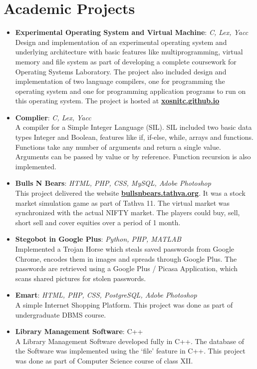 \documentclass[letterpaper,11pt]{article}
\newcommand{\resumeItem}[2]{
  \item\small{
    \textbf{#1}{: #2 \vspace{-2pt}}
  }
}
\newcommand{\resumeItemListStart}{\begin{itemize}}
\newcommand{\resumeItemListEnd}{\end{itemize}\vspace{-5pt}}
\begin{document}
\section{Academic Projects}
    \resumeItemListStart
        \resumeItem{Experimental Operating System and Virtual Machine} {\textit{C, Lex, Yacc}}\\
        Design and implementation of an experimental operating system and underlying architecture with basic features like multiprogramming, virtual memory and file system as part of developing a complete coursework for Operating Systems Laboratory. The project also included design and implementation of two language compilers, one for programming the operating system and one for programming application programs to run on this operating system. The project is hosted at \textbf{\href{http://xosnitc.github.io/}{xosnitc.github.io}}
        \resumeItem{Complier} {\textit{C, Lex, Yacc}}\\
        A compiler for a Simple Integer Language (SIL). SIL included two basic data types Integer and Boolean, features like if, if-else, while, arrays and functions. Functions take any number of arguments and return a single value. Arguments can be passed by value or by reference. Function recursion is also implemented.
        \resumeItem{Bulls N Bears} {\textit{HTML, PHP, CSS, MySQL, Adobe Photoshop}}\\
        This project delivered the website \textbf{\href{http://bullsnbears.tathva.org/}{bullsnbears.tathva.org}}. It was a stock market simulation game as part of Tathva 11. The virtual market was synchronized with the actual NIFTY market. The players could buy, sell, short sell and cover equities over a period of 1 month.
        \resumeItem{Stegobot in Google Plus} {\textit{Python, PHP, MATLAB}}\\
        Implemented a Trojan Horse which steals saved passwords from Google Chrome, encodes them in images and spreads through Google Plus. The passwords are retrieved using a Google Plus / Picasa Application, which scans shared pictures for stolen passwords.
        \resumeItem{Emart} {\textit{HTML, PHP, CSS, PostgreSQL, Adobe Photoshop}}\\
        A simple Internet Shopping Platform. This project was done as part of undergraduate DBMS course.
        \resumeItem{Library Management Software}{C++}\\
        A Library Management Software developed fully in C++. The database of the Software was implemented using the ‘file’ feature in C++. This project was done as part of Computer Science course of class XII.
    \resumeItemListEnd
\end{document}
